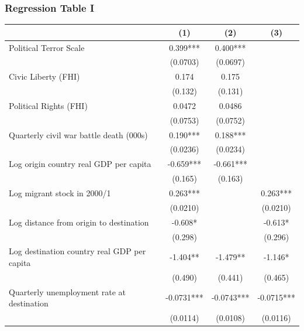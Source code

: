 \documentclass[compress, xcolor = {table,xcdraw}]{beamer}
\begin{document}
\begin{frame}
\frametitle{Regression Table I}
\begin{table}
	\centering
	\tiny
	\begin{tabular}{l*{3}{c}}
		\hline\hline
		&\multicolumn{1}{c}{(1)}         &\multicolumn{1}{c}{(2)}         &\multicolumn{1}{c}{(3)}         \\
		\hline
		Political Terror Scale&       0.399*** &       0.400***&                     \\
		&    (0.0703)         &    (0.0697)         &                     \\
		[0.2em]
		Civic Liberty (FHI) &       0.174         &       0.175         &                     \\
		&     (0.132)         &     (0.131)         &                     \\
		[0.2em]
		Political Rights (FHI)&      0.0472         &      0.0486         &                     \\
		&    (0.0753)         &    (0.0752)         &                     \\
		[0.2em]
		Quarterly civil war battle death (000s)&       0.190***&       0.188***&                     \\
		&    (0.0236)         &    (0.0234)         &                     \\
		[0.2em]
		Log origin country real GDP per capita&      -0.659***&      -0.661***&                     \\
		&     (0.165)         &     (0.163)         &                     \\
		[0.2em]
		Log migrant stock in 2000/1&       0.263***&                     &       0.263***\\
		&    (0.0210)         &                     &    (0.0210)         \\
		[0.2em]
		Log distance from origin to destination&      -0.608*  &                     &      -0.613*  \\
		&     (0.298)         &                     &     (0.296)         \\
		[0.2em]
		Log destination country real GDP per capita&      -1.404** &      -1.479** &      -1.146*  \\
		&     (0.490)         &     (0.441)         &     (0.465)         \\
		[0.2em]
		Quarterly unemployment rate at destination&     -0.0731***&     -0.0743***&     -0.0715***\\
		&    (0.0114)         &    (0.0108)         &    (0.0116)         \\

\end{tabular}
\end{table}
\end{frame}
\end{document}
